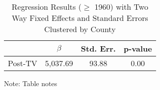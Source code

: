 \noindent 

\begin{table}[H]

\caption{Regression Results ($\geq$ 1960) with Two Way Fixed Effects and Standard Errors Clustered by County\label{tab:regression_ge_1960_cls}}

\medskip{}



\begin{centering}

\begin{tabular}{cccc}

\hline 

 & $\beta$ & Std. Err. & p-value\tabularnewline

\hline 

Post-TV & 5,037.69 & 93.88 & 0.00\tabularnewline

\hline 

\end{tabular}

\par\end{centering}

\begin{centering}

\medskip{}

\par\end{centering}

{\footnotesize{}Note: Table notes}{\footnotesize\par}

\end{table}